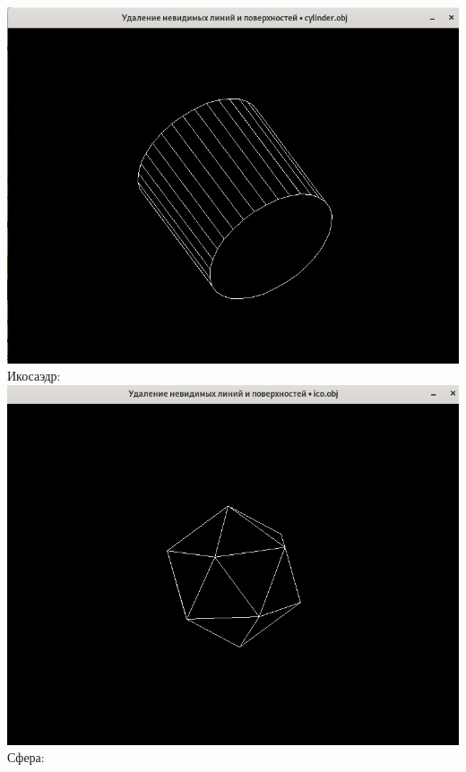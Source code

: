 \documentclass[a4paper,12pt]{article}
\begin{document}
\begin{flushleft}
  \includegraphics[scale=1.5]{cylinder.png}\linebreak\linebreak
  Икосаэдр:\linebreak
  \includegraphics[scale=1.5]{ico.png}\linebreak\linebreak
  Сфера:\linebreak

\end{flushleft}
\end{document}
